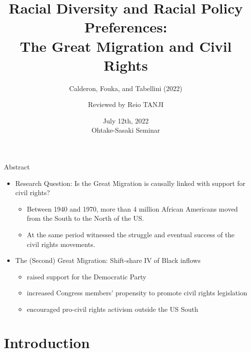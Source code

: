 \documentclass[dvipdfmx,11pt]{beamer}
\title[Calderon, Fouka, and Tabellini (2022)]{Racial Diversity and Racial Policy Preferences: \\
The Great Migration and Civil Rights}
\subtitle{Calderon, Fouka, and Tabellini (2022)}
\author{Reviewed by Reio TANJI}
\date[6/12/2022 OS Seminar]{July 12th, 2022 \\ Ohtake-Sasaki Seminar}
\institute[]{Osaka University, Graduate School of Economics}
\begin{document}
\begin{frame}\frametitle{}
\titlepage
\end{frame}

\begin{frame}{Abstract}
  \begin{itemize}
    \item Research Question: Is the Great Migration is causally linked with support for civil rights?
    \begin{itemize}
      \item Between 1940 and 1970, more than 4 million African Americans moved from the South to the North of the US.
      \item At the same period witnessed the struggle and eventual success of the civil rights movements.
    \end{itemize}
    \item The (Second) Great Migration: Shift-share IV of Black inflows
    \begin{itemize}
      \item raised support for the Democratic Party
      \item increased Congress members' propensity to promote civil rights legislation
      \item encouraged pro-civil rights activism outside the US South
    \end{itemize} 
  \end{itemize}
\end{frame}

\frame{\tableofcontents}

\section{Introduction}
\frame{\sectionpage}
\end{document}

